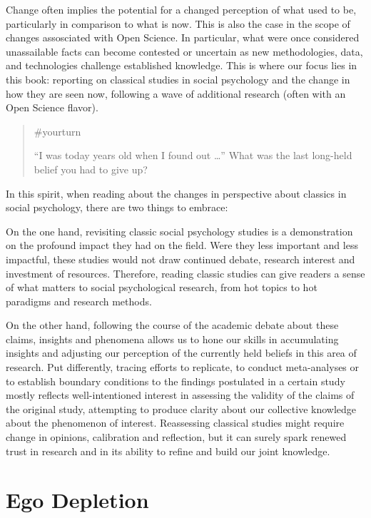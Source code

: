 \documentclass[
  letterpaper,
]{book}
\begin{document}
Change often implies the potential for a changed perception of what used
to be, particularly in comparison to what is now. This is also the case
in the scope of changes assosciated with Open Science. In particular,
what were once considered unassailable facts can become contested or
uncertain as new methodologies, data, and technologies challenge
established knowledge. This is where our focus lies in this book:
reporting on classical studies in social psychology and the change in
how they are seen now, following a wave of additional research (often
with an Open Science flavor).

\begin{quote}
{\#yourturn}

``I was today years old when I found out \ldots{}'' What was the last
long-held belief you had to give up?
\end{quote}

In this spirit, when reading about the changes in perspective about
classics in social psychology, there are two things to embrace:

On the one hand, revisiting classic social psychology studies is a
demonstration on the profound impact they had on the field. Were they
less important and less impactful, these studies would not draw
continued debate, research interest and investment of resources.
Therefore, reading classic studies can give readers a sense of what
matters to social psychological research, from hot topics to hot
paradigms and research methods.

On the other hand, following the course of the academic debate about
these claims, insights and phenomena allows us to hone our skills in
accumulating insights and adjusting our perception of the currently held
beliefs in this area of research. Put differently, tracing efforts to
replicate, to conduct meta-analyses or to establish boundary conditions
to the findings postulated in a certain study mostly reflects
well-intentioned interest in assessing the validity of the claims of the
original study, attempting to produce clarity about our collective
knowledge about the phenomenon of interest. Reassessing classical
studies might require change in opinions, calibration and reflection,
but it can surely spark renewed trust in research and in its ability to
refine and build our joint knowledge.


\chapter{\texorpdfstring{{Ego
Depletion}}{Ego Depletion}}\label{ego-depletion}
\end{document}
